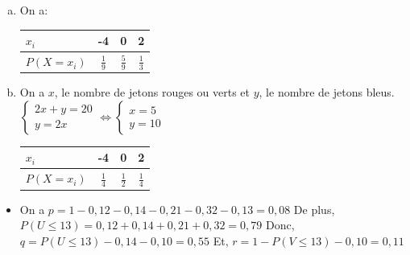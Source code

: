 \documentclass[12pt, a4paper]{article}
\begin{document}
    \begin{Exercise}[number={36}]
      \begin{enumerate}[a)]
        \item On a:
              \begin{center}\begin{tabular}{ | l | *{3}{c|} }
                \hline      
                $x_i$                     & -4            & 0             & 2             \\ \hline
                $P(X=x_i)$ \hspace{0.5cm} & $\frac{1}{9}$ & $\frac{5}{9}$ & $\frac{1}{3}$ \\ \hline
              \end{tabular}\end{center}
        \item On a $x$, le nombre de jetons rouges ou verts et $y$, le nombre de jetons bleus. \medbreak
              $\begin{cases}2x+y=20\\y=2x\end{cases}\iff\begin{cases}x=5\\y=10\end{cases}$ \medbreak
              \begin{center}\begin{tabular}{ | l | *{3}{c|} }
                \hline
                $x_i$                     & -4            & 0             & 2             \\ \hline
                $P(X=x_i)$ \hspace{0.5cm} & $\frac{1}{4}$ & $\frac{1}{2}$ & $\frac{1}{4}$ \\ \hline
              \end{tabular}\end{center}
      \end{enumerate}
    \end{Exercise}

    \clearpage

    \begin{Exercise}[number={39}]
      \begin{itemize}
        \item[] On a $p=1-0{,}12-0{,}14-0{,}21-0{,}32-0{,}13=0{,}08$ \medbreak
                De plus, $P(U\leq 13)=0{,}12+0{,}14+0{,}21+0{,}32=0{,}79$ \medbreak
                Donc, $q=P(U\leq 13)-0{,}14-0{,}10=0{,}55$ \medbreak
                Et, $r=1-P(V\leq 13)-0{,}10=0{,}11$
      \end{itemize}
    \end{Exercise}
\end{document}
